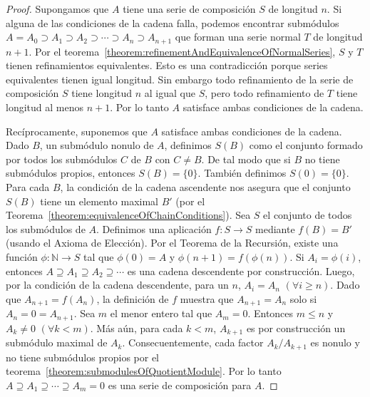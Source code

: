 \documentclass{report}
\newcommand{\naturalNumbers}{\mathbb{N}}
\begin{document}
  \begin{proof}
    Supongamos que \(A\) tiene una serie de composición \(S\) de longitud \(n\).
    Si alguna de las condiciones de la cadena falla, podemos encontrar submódulos \(A = A_0 \supset A_1 \supset A_2 \supset \cdots \supset A_n \supset A_{n + 1}\)
    que forman una serie normal \(T\) de longitud \(n + 1\).
    Por el teorema~\ref{theorem:refinementAndEquivalenceOfNormalSeries}, \(S\) y \(T\) tienen refinamientos equivalentes.
    Esto es una contradicción porque series equivalentes tienen igual longitud.
    Sin embargo todo refinamiento de la serie de composición \(S\) tiene longitud \(n\) al igual que \(S\), pero todo refinamiento de \(T\) tiene longitud al menos \(n + 1\).
    Por lo tanto \(A\) satisface ambas condiciones de la cadena.

    Recíprocamente, suponemos que \(A\) satisface ambas condiciones de la cadena.
    Dado \(B\), un submódulo nonulo de \(A\), definimos \(S(B)\) como el conjunto formado por todos los submódulos \(C\) de \(B\) con \(C \neq B\).
    De tal modo que si \(B\) no tiene submódulos propios, entonces \(S(B) = \{0\}\).
    También definimos \(S(0) = \{0\}\).
    Para cada \(B\), la condición de la cadena ascendente nos asegura que el conjunto \(S(B)\) tiene un elemento maximal \(B'\) (por el Teorema~\ref{theorem:equivalenceOfChainConditions}).
    Sea \(S\) el conjunto de todos los submódulos de \(A\).
    Definimos una aplicación \(f : S \rightarrow S\) mediante \(f(B) = B'\) (usando el Axioma de Elección).
    Por el Teorema de la Recursión, existe una función \(\phi : \naturalNumbers \rightarrow S\) tal que \(\phi(0) = A\) y \(\phi(n + 1) = f(\phi(n))\).
    Si \(A_i = \phi(i)\), entonces \(A \supseteq A_1 \supseteq A_2 \supseteq \cdots\) es una cadena descendente por construcción.
    Luego, por la condición de la cadena descendente, para un \(n\), \(A_i = A_n\) \((\forall i \geq n)\).
    Dado que \(A_{n + 1} = f(A_n)\), la definición de \(f\) muestra que \(A_{n + 1} = A_n\) solo si \(A_n = 0 = A_{n + 1}\).
    Sea \(m\) el menor entero tal que \(A_m = 0\).
    Entonces \(m \leq n\) y \(A_k \neq 0\) \((\forall k < m)\).
    Más aún, para cada \(k < m\), \(A_{k + 1}\) es por construcción un submódulo maximal de \(A_k\).
    Consecuentemente, cada factor \(A_k / A_{k + 1}\) es nonulo y no tiene submódulos propios por el teorema~\ref{theorem:submodulesOfQuotientModule}.
    Por lo tanto \(A \supseteq A_1 \supseteq \cdots \supseteq A_m = 0\) es una serie de composición para \(A\).
  \end{proof}
\end{document}
